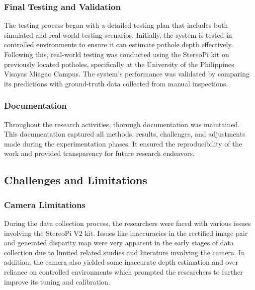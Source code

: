 
\subsubsection{Final Testing and Validation}
The testing process began with a detailed testing plan that includes both simulated and real-world testing scenarios. Initially, the system is tested in controlled environments to ensure it can estimate pothole depth effectively. Following this, real-world testing was conducted using the StereoPi kit on previously located potholes, specifically at the University of the Philippines Visayas Miagao Campus. The system's performance was validated by comparing its predictions with ground-truth data collected from manual inspections. 

\subsubsection{Documentation}
Throughout the research activities, thorough documentation was maintained. This documentation captured all methods, results, challenges, and adjustments made during the experimentation phases. It ensured the reproducibility of the work and provided transparency for future research endeavors. 

\subsection{Challenges and Limitations}

\subsubsection{Camera Limitations}
During the data collection process, the researchers were faced with various issues involving the StereoPi V2 kit. Issues like inaccuracies in the rectified image pair and generated disparity map were very apparent in the early stages of data collection due to limited related studies and literature involving the camera. In addition, the camera also yielded some inaccurate depth estimation and over reliance on controlled environments which prompted the researchers to further improve its tuning and calibration.

